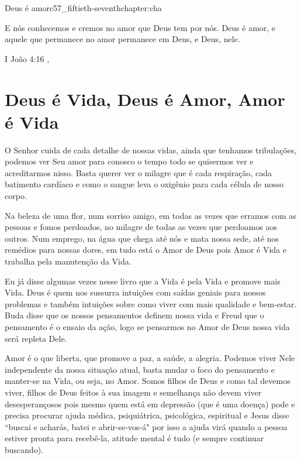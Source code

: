 \begin{chapterpage}{Deus é amor}{c57_fiftieth-seventhchapter:cha}
 
\begin{myquotation}E nós conhecemos e cremos no amor que Deus tem por nós. Deus é amor, e aquele que permanece no amor permanece em Deus, e Deus, nele.
\par\vspace*{15mm}
\mbox{}\hfill \emdash{}I João 4:16
, %
\par\end{myquotation}

\end{chapterpage}



\section{Deus é Vida, Deus é Amor, Amor é Vida}\label{c1_basicformatting:sec}

\emdash{}O Senhor cuida de cada detalhe de nossas vidas, ainda que tenhamos tribulações, podemos ver Seu amor para conosco o tempo todo se quisermos ver e acreditarmos nisso. Basta querer ver o milagre que é cada respiração, cada batimento cardíaco e como o sangue leva o oxigênio para cada célula de nosso corpo.

\emdash{}Na beleza de uma flor, num sorriso amigo, em todas as vezes que erramos com as pessoas e fomos perdoados, no milagre de todas as vezes que perdoamos aos outros. Num emprego, na água que chega até nós e mata nossa sede, até nos remédios para nossas dores, em tudo está o Amor de Deus pois Amor é Vida e trabalha pela manutenção da Vida.

\emdash{}Eu já disse algumas vezes nesse livro que a Vida é pela Vida e promove mais Vida. Deus é quem nos sussurra intuições com saídas geniais para nossos problemas e também intuições sobre como viver com mais qualidade e bem-estar. Buda disse que os nossos pensamentos definem nossa vida e Freud que o pensamento é o ensaio da ação, logo se pensarmos no Amor de Deus nossa vida será repleta Dele.

\emdash{}Amor é o que liberta, que promove a paz, a saúde, a alegria. Podemos viver Nele independente da nossa situação atual, basta mudar o foco do pensamento e manter-se na Vida, ou seja, no Amor. Somos filhos de Deus e como tal devemos viver, filhos de Deus feitos à sua imagem e semelhança não devem viver desesperançosos pois mesmo quem está em depressão (que é uma doença) pode e precisa procurar ajuda médica, psiquiátrica, psicológica, espiritual e Jesus disse ``buscai e acharás, batei e abrir-se-vos-á" por isso a ajuda virá quando a pessoa estiver pronta para recebê-la, atitude mental é tudo (e sempre continuar buscando).

